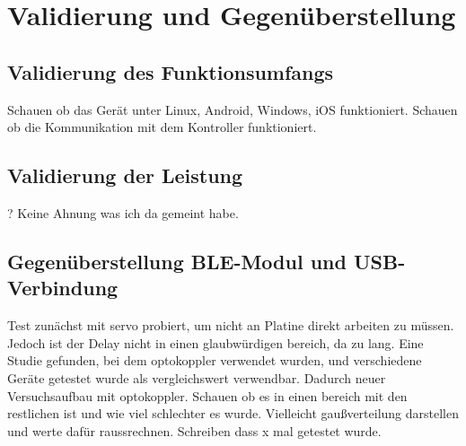 
\chapter{Validierung und Gegenüberstellung}

\section{Validierung des Funktionsumfangs}
Schauen ob das Gerät unter Linux, Android, Windows, iOS funktioniert. Schauen ob die Kommunikation mit dem Kontroller funktioniert.

\section{Validierung der Leistung}
? Keine Ahnung was ich da gemeint habe.

\section{Gegenüberstellung BLE-Modul und USB-Verbindung}
Test zunächst mit servo probiert, um nicht an Platine direkt arbeiten zu müssen. Jedoch ist der Delay nicht in einen glaubwürdigen bereich, da zu lang.
Eine Studie gefunden, bei dem optokoppler verwendet wurden, und verschiedene Geräte getestet wurde als vergleichswert verwendbar.
Dadurch neuer Versuchsaufbau mit optokoppler. Schauen ob es in einen bereich mit den restlichen ist und wie viel schlechter es wurde.
Vielleicht gaußverteilung darstellen und werte dafür raussrechnen. Schreiben dass x mal getestet wurde.